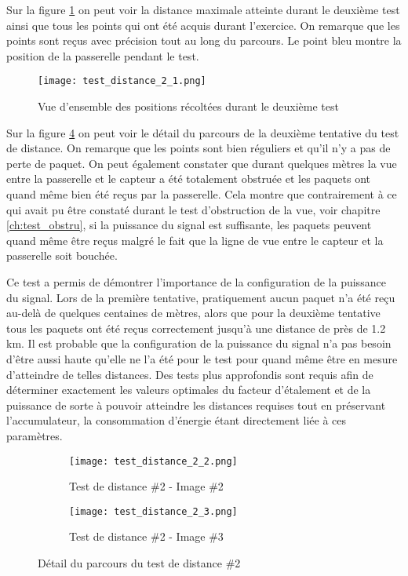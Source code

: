 Sur la figure \ref{fig:test_distance_2_1} on peut voir la distance maximale atteinte durant le deuxième test ainsi que tous les points qui ont été acquis durant l'exercice. On remarque que les points sont reçus avec précision tout au long du parcours. Le point bleu montre la position de la passerelle pendant le test.

\begin{figure}[htb]
\centering
\texttt{[image: test\_distance\_2\_1.png]} 
\caption{Vue d'ensemble des positions récoltées durant le deuxième test}
\label{fig:test_distance_2_1}
\end{figure}

Sur la figure \ref{fig:test_distance_2_2} on peut voir le détail du parcours de la deuxième tentative du test de distance. On remarque que les points sont bien réguliers et qu'il n'y a pas de perte de paquet. On peut également constater que durant quelques mètres la vue entre la passerelle et le capteur a été totalement obstruée et les paquets ont quand même bien été reçus par la passerelle. Cela montre que contrairement à ce qui avait pu être constaté durant le test d'obstruction de la vue, voir chapitre \ref{ch:test_obstru}, si la puissance du signal est suffisante, les paquets peuvent quand même être reçus malgré le fait que la ligne de vue entre le capteur et la passerelle soit bouchée.

Ce test a permis de démontrer l'importance de la configuration de la puissance du signal. Lors de la première tentative, pratiquement aucun paquet n'a été reçu au-delà de quelques centaines de mètres, alors que pour la deuxième tentative tous les paquets ont été reçus correctement jusqu'à une distance de près de 1.2 km. Il est probable que la configuration de la puissance du signal n'a pas besoin d'être aussi haute qu'elle ne l'a été pour le test pour quand même être en mesure d'atteindre de telles distances. Des tests plus approfondis sont requis afin de déterminer exactement les valeurs optimales du facteur d'étalement et de la puissance de sorte à pouvoir atteindre les distances requises tout en préservant l'accumulateur, la consommation d'énergie étant directement liée à ces paramètres.

\begin{figure}[tb]
\centering
\begin{subfigure}{0.9\textwidth}
  \centering
  \texttt{[image: test\_distance\_2\_2.png]}
  \caption{Test de distance \#2 - Image \#2}
  \label{fig:test_distance_2_2}
\end{subfigure}%

\begin{subfigure}{0.9\textwidth}
  \centering
  \texttt{[image: test\_distance\_2\_3.png]}
  \caption{Test de distance \#2 - Image \#3}
  \label{fig:test_distance_2_3}
\end{subfigure}
\caption{Détail du parcours du test de distance \#2}
\label{fig:test_distance_2_2}
\end{figure}

